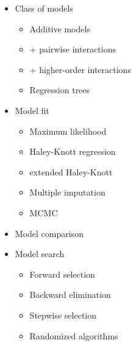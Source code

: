 \documentclass[12pt]{article}
\newcommand{\smallestsize}{\fontsize{18}{22} \selectfont}
\begin{document}
\hspace{0.5in}
\begin{minipage}[t]{4in}
\vspace*{0mm}

\begin{itemize}
\item Class of models
{\smallestsize \color{myblue} \begin{itemize}
\item Additive models
\item + pairwise interactions
\item + higher-order interactions
\item Regression trees
\end{itemize} }

\vspace{15mm}

\item Model fit
{\smallestsize \color{myblue} \begin{itemize}
\item Maximum likelihood
\item Haley-Knott regression
\item extended Haley-Knott
\item Multiple imputation
\item MCMC
\end{itemize} }

\end{itemize}

\end{minipage} \hspace{1in}
\begin{minipage}[t]{4in}
\vspace*{0mm}

\begin{itemize}
\item Model comparison
{\smallestsize \color{myblue}  }

\vspace{15mm}


\item Model search
{\smallestsize \color{myblue} \begin{itemize}
\item Forward selection
\item Backward elimination
\item Stepwise selection
\item Randomized algorithms 
\end{itemize} }


\end{itemize}

\end{minipage} 
\end{document}
